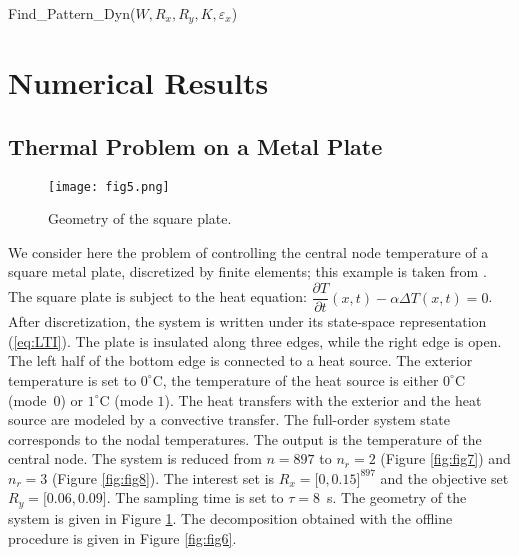 \begin{algorithm}[ht]
\centering
\begin{algorithmic}
   \\
      
    {}\ENDIF
    \ENDWHILE
    \ENDFOR
\end{algorithmic}
   \caption{\small Find\_Pattern\_Dyn($W,R_x,R_y,K,\varepsilon_x$)}
\label{alg:findPat2_part5}
\end{algorithm}

 
 
 \section{Numerical Results}
 \label{sec:examples}
  \subsection{Thermal Problem on a Metal Plate}
  \label{sec:thermal}

  \begin{figure}[ht]
\centering
 \texttt{[image: fig5.png]}
\caption{Geometry of the square plate.}
\label{fig:fig5}
\end{figure}
  
We consider here the problem of controlling the central node temperature of a square metal plate,
discretized by finite elements; this example
is taken from \cite{han_krogh_06}. The square plate is subject to the heat equation: 
$\dfrac{\partial T}{\partial t}(x,t) - \alpha \Delta T(x,t) = 0$.
After discretization, the system is written under its state-space representation (\ref{eq:LTI}). 
The plate is insulated along three edges, while the right edge is open. The left half
of the bottom edge is connected to a heat source. The exterior temperature
is set to $0^\circ$C, the temperature of the heat source is either $0^\circ$C (mode~$0$) or $1^\circ$C (mode $1$).
The heat transfers with the exterior and the heat source are modeled by a 
convective transfer. 
The full-order system state corresponds to the nodal temperatures. The output
is the temperature of the central node. The system is reduced from
$n=897$ to $n_r=2$ (Figure \ref{fig:fig7}) and $n_r=3$ (Figure \ref{fig:fig8}). The interest set is $R_x = \lbrack 0 , 0.15 \rbrack^{897}$ and the objective
set $R_y = \lbrack 0.06 , 0.09 \rbrack$. The sampling time is set to $\tau = 8$~s. 
The geometry of the system is given in Figure \ref{fig:fig5}. The decomposition obtained
with the offline procedure is given in Figure \ref{fig:fig6}. 

